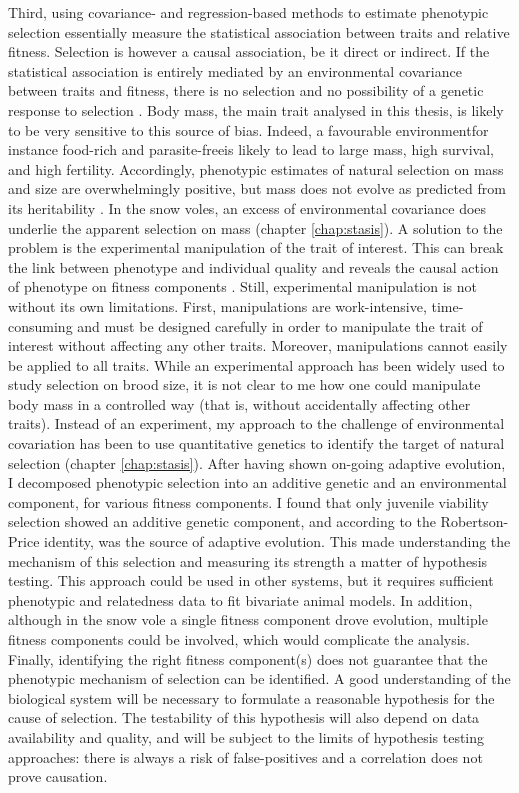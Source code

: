Third, using covariance- and regression-based methods to estimate phenotypic selection essentially measure the statistical association between traits and relative fitness. Selection is however a causal association, be it direct or indirect. If the statistical association is entirely mediated by an environmental covariance between traits and fitness, there is no selection and no possibility of a genetic response to selection \parencite{Price1989, Rausher1992}. 
Body mass, the main trait analysed in this thesis, is likely to be very sensitive to this source of bias. Indeed, a favourable environment\textemdash for instance food-rich and parasite-free\textemdash is likely to lead to large mass, high survival, and high fertility. Accordingly, phenotypic estimates of natural selection on mass and size are overwhelmingly positive, but mass does not evolve as predicted from its heritability \parencite{Blanckenhorn2000, Kingsolver2012}. In the snow voles, an excess of environmental covariance does underlie the apparent selection on mass (chapter \ref{chap:stasis}).
A solution to the problem is the experimental manipulation of the trait of interest. This can break the link between phenotype and individual quality and reveals the causal action of phenotype on fitness components \parencite[e.g.][]{Tinbergen2004, Tschirren2006}. Still, experimental manipulation is not without its own limitations.
First, manipulations are work-intensive, time-consuming and must be designed carefully in order to manipulate the trait of interest without affecting any other traits. Moreover, manipulations cannot easily be applied to all traits. While an experimental approach has been widely used to study selection on brood size, it is not clear to me how one could manipulate body mass in a controlled way (that is, without accidentally affecting other traits).
Instead of an experiment, my approach to the challenge of environmental covariation has been to use quantitative genetics to identify the target of natural selection (chapter \ref{chap:stasis}). After having shown on-going adaptive evolution, I decomposed phenotypic selection into an additive genetic and an environmental component, for various fitness components. I found that only juvenile viability selection showed an additive genetic component, and according to the Robertson-Price identity, was the source of adaptive evolution. This made understanding the mechanism of this selection and measuring its strength a matter of hypothesis testing.
This approach could be used in other systems, but it requires sufficient phenotypic and relatedness data to fit bivariate animal models. In addition, although in the snow vole a single fitness component drove evolution, multiple fitness components could be involved, which would complicate the analysis. Finally, identifying the right fitness component(s) does not guarantee that the phenotypic mechanism of selection can be identified. A good understanding of the biological system will be necessary to formulate a reasonable hypothesis for the cause of selection. The testability of this hypothesis will also depend on data availability and quality, and will be subject to the limits of hypothesis testing approaches: there is always a risk of false-positives and a correlation does not prove causation.


